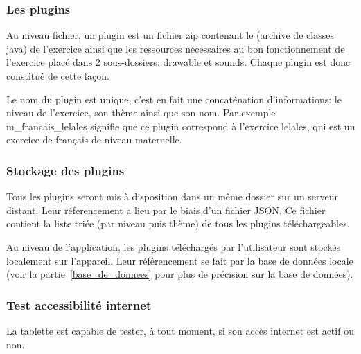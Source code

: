 \subsubsection{Les plugins}
Au niveau fichier, un plugin est un fichier \og{}zip\fg{} contenant le \jar{} (archive de classes java) de l'exercice ainsi que les ressources nécessaires au bon fonctionnement de l'exercice placé dans 2 sous-dossiers: \og{}drawable\fg{} et \og{}sounds\fg{}. Chaque plugin est donc constitué de cette façon.

Le nom du plugin est unique, c'est en fait une concaténation d'informations: le niveau de l'exercice, son thème ainsi que son nom. Par exemple \og{}m\_francais\_lelales\fg{} signifie que ce plugin correspond à l'exercice \og{}lelales\fg{}, qui est un exercice de français de niveau maternelle.

\subsubsection{Stockage des plugins}
\label{importation_plugin-stockage}
Tous les plugins seront mis à disposition dans un même dossier sur un serveur distant. Leur réferencement a lieu par le biais d'un fichier JSON. Ce fichier contient la liste triée (par niveau puis thème) de tous les plugins téléchargeables.

Au niveau de l'application, les plugins téléchargés par l'utilisateur sont stockés localement sur l'appareil. Leur référencement se fait par la base de données locale (voir la partie~\ref{base_de_donnees} pour plus de précision sur la base de données).

\subsubsection{Test accessibilité internet}
La tablette est capable de tester, à tout moment, si son accès internet est actif ou non.

